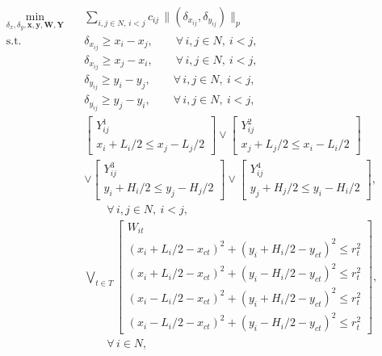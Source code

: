 \documentclass[11pt]{article}
\begin{document}
\begingroup
\begin{equation}
\label{eq:clay}
\begin{aligned}
\min_{\delta_x, \delta_y, \mathbf{x}, \mathbf{y}, \mathbf{W}, \mathbf{Y}} \quad
& \sum_{i,j \in N,\, i < j} c_{ij}\,\|(\delta_{x_{ij}}, \delta_{y_{ij}})\|_p
\\[0.3em]
\text{s.t.} \quad
& \delta_{x_{ij}} \ge x_i - x_j,
\qquad \forall\, i,j \in N,\ i<j,
\\
& \delta_{x_{ij}} \ge x_j - x_i,
\qquad \forall\, i,j \in N,\ i<j,
\\
& \delta_{y_{ij}} \ge y_i - y_j,
\qquad \forall\, i,j \in N,\ i<j,
\\
& \delta_{y_{ij}} \ge y_j - y_i,
\qquad \forall\, i,j \in N,\ i<j,
\\[0.3em]
&
\left[
\begin{array}{c}
Y_{ij}^1 \\
x_i + L_i/2 \le x_j - L_j/2
\end{array}
\right]
\vee
\left[
\begin{array}{c}
Y_{ij}^2 \\
x_j + L_j/2 \le x_i - L_i/2
\end{array}
\right]
\\
& \vee
\left[
\begin{array}{c}
Y_{ij}^3 \\
y_i + H_i/2 \le y_j - H_j/2
\end{array}
\right]
\vee
\left[
\begin{array}{c}
Y_{ij}^4 \\
y_j + H_j/2 \le y_i - H_i/2
\end{array}
\right],
\\
& \hspace{2em} \forall\, i,j \in N,\ i<j,
\\[0.3em]
&
\bigvee_{t \in T}
\left[
\begin{array}{c}
W_{it} \\
(x_i + L_i/2 - x_{ct})^2 + (y_i + H_i/2 - y_{ct})^2 \le r_t^2 \\
(x_i + L_i/2 - x_{ct})^2 + (y_i - H_i/2 - y_{ct})^2 \le r_t^2 \\
(x_i - L_i/2 - x_{ct})^2 + (y_i + H_i/2 - y_{ct})^2 \le r_t^2 \\
(x_i - L_i/2 - x_{ct})^2 + (y_i - H_i/2 - y_{ct})^2 \le r_t^2
\end{array}
\right],
\\
& \hspace{2em} \forall\, i \in N,
\\[0.3em]

\end{aligned}
\end{equation}
\end{document}
